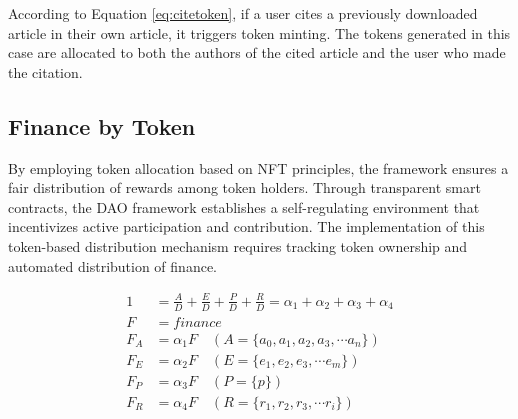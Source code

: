 \documentclass[lettersize,journal]{IEEEtran}
\begin{document}
According to Equation \ref{eq:citetoken}, if a user cites a previously downloaded article in their own article, it triggers token minting. The tokens generated in this case are allocated to both the authors of the cited article and the user who made the citation.



\subsection{Finance by Token}

By employing token allocation based on NFT principles, the framework ensures a fair distribution of rewards among token holders. Through transparent smart contracts, the DAO framework establishes a self-regulating environment that incentivizes active participation and contribution. The implementation of this token-based distribution mechanism requires tracking token ownership and automated distribution of finance.

\begin{equation}
  \begin{aligned}
    1 &= \frac{A}{D} + \frac{E}{D} + \frac{P}{D} + \frac{R}{D} = \alpha_1 + \alpha_2 + \alpha_3 + \alpha_4 \\
    F &= finance \\
    F_A &= \alpha_1 F \quad (A=\{a_0, a_1, a_2, a_3, \cdots a_n\}) \\
    F_E &= \alpha_2 F \quad (E=\{e_1, e_2, e_3, \cdots e_m\}) \\
    F_P &= \alpha_3 F \quad (P=\{p\}) \\ 
    F_R &= \alpha_4 F \quad (R=\{r_1, r_2, r_3, \cdots r_i\})
  \end{aligned}
  \label{eq:finance}
\end{equation}
\end{document}
